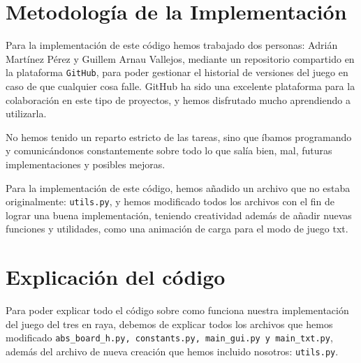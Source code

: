 \documentclass[a4paper,12pt]{article}
\begin{document}
\section*{Metodología de la Implementación}
Para la implementación de este código hemos trabajado dos personas: Adrián Martínez Pérez y Guillem Arnau Vallejos,
mediante un repositorio compartido en la plataforma \texttt{GitHub}, para poder gestionar el historial de versiones
del juego en caso de que cualquier cosa falle. GitHub ha sido una excelente plataforma para la colaboración en este tipo
de proyectos, y hemos disfrutado mucho aprendiendo a utilizarla.

No hemos tenido un reparto estricto de las tareas, sino que íbamos programando y comunicándonos constantemente sobre todo lo que salía bien, mal, futuras implementaciones y posibles mejoras.

Para la implementación de este código, hemos añadido un archivo que no estaba originalmente: \texttt{utils.py}, y hemos
modificado todos los archivos con el fin de lograr una buena implementación, teniendo creatividad además de añadir nuevas
funciones y utilidades, como una animación de carga para el modo de juego txt.

\section*{Explicación del código}
Para poder explicar todo el código sobre como funciona nuestra implementación del juego del tres en raya, debemos de explicar
todos los archivos que hemos modificado \texttt{abs\_board\_h.py, constants.py, main\_gui.py y main\_txt.py}, además del archivo 
de nueva creación que hemos incluido nosotros: \texttt{utils.py}.
\end{document}
